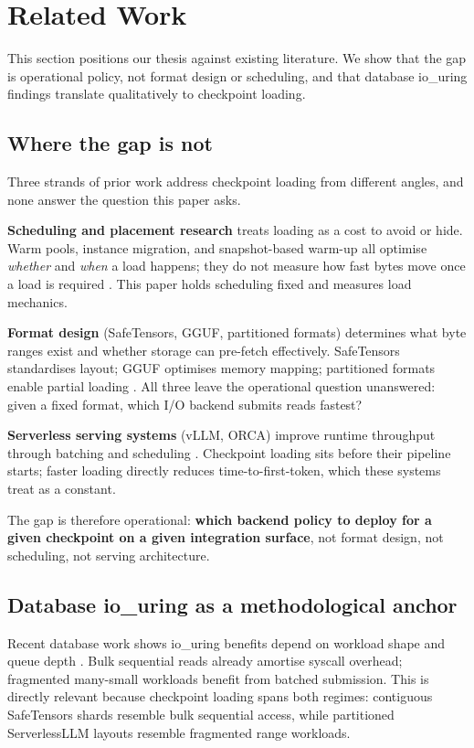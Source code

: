 \section{Related Work}
\label{sec:related_work}

This section positions our thesis against existing literature. We show that the gap is operational policy, not format design or scheduling, and that database io\_uring findings translate qualitatively to checkpoint loading.

\subsection{Where the gap is not}

Three strands of prior work address checkpoint loading from different angles, and none answer the question this paper asks.

\textbf{Scheduling and placement research} treats loading as a cost to avoid or hide. Warm pools, instance migration, and snapshot-based warm-up all optimise \emph{whether} and \emph{when} a load happens; they do not measure how fast bytes move once a load is required \cite{FU:2024,silva2021snapshot}. This paper holds scheduling fixed and measures load mechanics.

\textbf{Format design} (SafeTensors, GGUF, partitioned formats) determines what byte ranges exist and whether storage can pre-fetch effectively. SafeTensors standardises layout; GGUF optimises memory mapping; partitioned formats enable partial loading \cite{safetensors_docs,serverlessllm_repo}. All three leave the operational question unanswered: given a fixed format, which I/O backend submits reads fastest?

\textbf{Serverless serving systems} (vLLM, ORCA) improve runtime throughput through batching and scheduling \cite{pagedattention,orca}. Checkpoint loading sits before their pipeline starts; faster loading directly reduces time-to-first-token, which these systems treat as a constant.

The gap is therefore operational: \textbf{which backend policy to deploy for a given checkpoint on a given integration surface}, not format design, not scheduling, not serving architecture.

\subsection{Database io\_uring as a methodological anchor}

Recent database work shows io\_uring benefits depend on workload shape and queue depth \cite{IOURING_DATABASE_GUIDELINES}. Bulk sequential reads already amortise syscall overhead; fragmented many-small workloads benefit from batched submission. This is directly relevant because checkpoint loading spans both regimes: contiguous SafeTensors shards resemble bulk sequential access, while partitioned ServerlessLLM layouts resemble fragmented range workloads.

